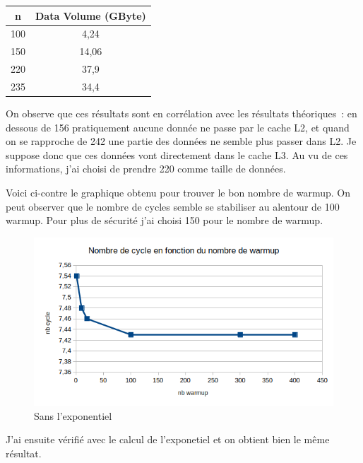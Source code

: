 \documentclass[12pt,a4paper]{article}
\begin{document}
\begin{table}[h]
    \centering
    \begin{tabular}{|c|c|}
        \hline
        n & Data Volume (GByte) \\
        \hline
        100 & 4,24 \\
        \hline
        150 & 14,06 \\
        \hline
        220 & 37,9 \\
        \hline
        235 & 34,4 \\
        \hline
    \end{tabular}
\end{table}

On observe que ces résultats sont en corrélation avec les résultats théoriques :
en dessous de 156 pratiquement aucune donnée ne passe par le cache L2, et 
quand on se rapproche de 242 une partie des données ne semble plus passer 
dans L2. Je suppose donc que ces données vont directement dans le cache L3.
Au vu de ces informations, j'ai choisi de prendre 220 comme taille de 
données.

Voici ci-contre le graphique obtenu pour trouver le bon nombre de warmup. On
peut observer que le nombre de cycles semble se stabiliser au alentour de 100
warmup. Pour plus de sécurité j'ai choisi 150 pour le nombre de warmup.

\begin{figure}[h]
    \includegraphics[scale=0.8]{figures/L2/L2warmup.png}
    \caption{Sans l'exponentiel}
\end{figure}

J'ai ensuite vérifié avec le calcul de l'exponetiel et on obtient bien le 
même résultat. 
\end{document}
